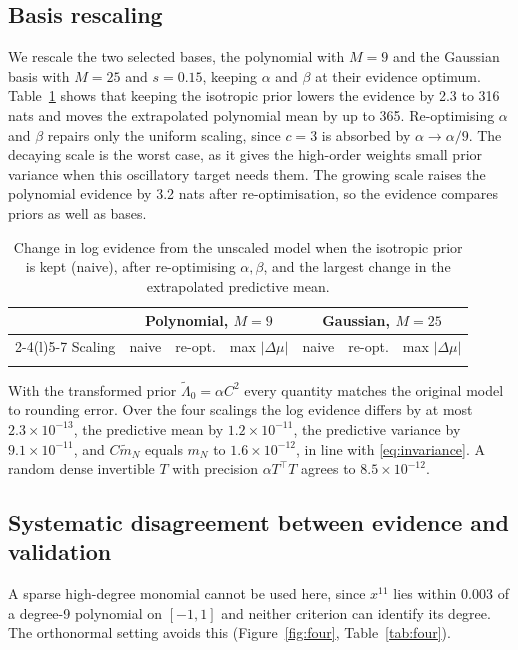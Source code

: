 \documentclass[10pt,a4paper]{article}
\begin{document}
\subsection{Basis rescaling}
We rescale the two selected bases, the polynomial with $M=9$ and the Gaussian basis with $M=25$ and $s=0.15$, keeping $\alpha$ and $\beta$ at their evidence optimum. Table~\ref{tab:three} shows that keeping the isotropic prior lowers the evidence by 2.3 to 316 nats and moves the extrapolated polynomial mean by up to 365. Re-optimising $\alpha$ and $\beta$ repairs only the uniform scaling, since $c=3$ is absorbed by $\alpha\to\alpha/9$. The decaying scale is the worst case, as it gives the high-order weights small prior variance when this oscillatory target needs them. The growing scale raises the polynomial evidence by 3.2 nats after re-optimisation, so the evidence compares priors as well as bases.

\begin{table}[!htbp]
\centering\footnotesize
\caption{Change in log evidence from the unscaled model when the isotropic prior is kept (naive), after re-optimising $\alpha,\beta$, and the largest change in the extrapolated predictive mean.}
\label{tab:three}
\begin{tabular}{@{}lrrrrrr@{}}
\toprule
& \multicolumn{3}{c}{Polynomial, $M=9$} & \multicolumn{3}{c}{Gaussian, $M=25$}\\
\cmidrule(lr){2-4}\cmidrule(l){5-7}
Scaling & naive & re-opt. & max $|\Delta\mu|$ & naive & re-opt. & max $|\Delta\mu|$\\
\midrule

\\[-1.6ex]
\bottomrule
\end{tabular}
\end{table}

With the transformed prior $\tilde\Lambda_0=\alpha C^2$ every quantity matches the original model to rounding error. Over the four scalings the log evidence differs by at most $2.3\times10^{-13}$, the predictive mean by $1.2\times10^{-11}$, the predictive variance by $9.1\times10^{-11}$, and $C\tilde m_N$ equals $m_N$ to $1.6\times10^{-12}$, in line with \eqref{eq:invariance}. A random dense invertible $T$ with precision $\alpha T^\top T$ agrees to $8.5\times10^{-12}$.

\subsection{Systematic disagreement between evidence and validation}
A sparse high-degree monomial cannot be used here, since $x^{11}$ lies within $0.003$ of a degree-9 polynomial on $[-1,1]$ and neither criterion can identify its degree. The orthonormal setting avoids this (Figure~\ref{fig:four}, Table~\ref{tab:four}).
\end{document}
